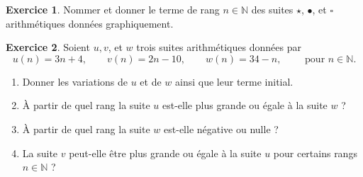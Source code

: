 \documentclass[12pt]{paper}
\theoremstyle{plain}
\theoremstyle{definition}
\newtheorem{ex}{Exercice}
\newcommand{\N}{\mathbb{N}}
\begin{document}
\begin{ex}

Nommer et donner le terme de rang $n \in \N$ des suites $\star$, $\bullet$, et $\square$ arithmétiques données graphiquement.

\begin{center}
\end{center}

\end{ex}

\begin{ex}
	Soient $u, v$, et $w$ trois suites arithmétiques données par
		\[ u(n ) = 3n + 4, \qquad v(n) = 2n -10, \qquad w(n) = 34 - n, \qquad \text{ pour } n \in \N.\]
	\begin{enumerate}
		\item Donner les variations de $u$ et de $w$ ainsi que leur terme initial.
		\item À partir de quel rang la suite $u$ est-elle plus grande ou égale à la suite $w$ ?
		\item À partir de quel rang la suite $w$ est-elle négative ou nulle ?
		\item La suite $v$ peut-elle être plus grande ou égale à la suite $u$ pour certains rangs $n\in\N$ ?
	\end{enumerate}
\end{ex}
\end{document}

